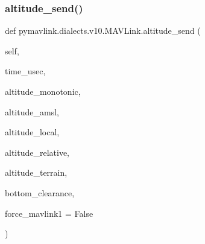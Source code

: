 \subsubsection{\texorpdfstring{altitude\+\_\+send()}{altitude\_send()}}
{\footnotesize\ttfamily def pymavlink.\+dialects.\+v10.\+M\+A\+V\+Link.\+altitude\+\_\+send (\begin{DoxyParamCaption}\item[{}]{self,  }\item[{}]{time\+\_\+usec,  }\item[{}]{altitude\+\_\+monotonic,  }\item[{}]{altitude\+\_\+amsl,  }\item[{}]{altitude\+\_\+local,  }\item[{}]{altitude\+\_\+relative,  }\item[{}]{altitude\+\_\+terrain,  }\item[{}]{bottom\+\_\+clearance,  }\item[{}]{force\+\_\+mavlink1 = {\ttfamily False} }\end{DoxyParamCaption})}

